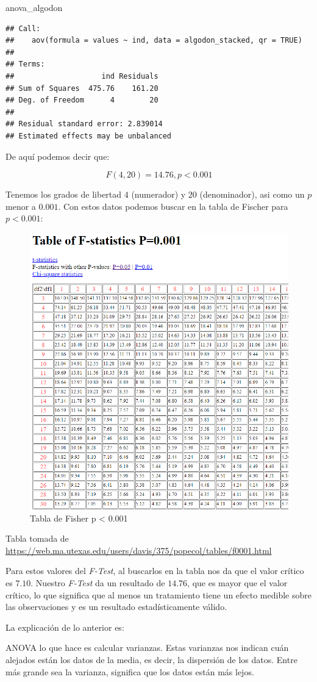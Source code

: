 \documentclass[]{article}
\newenvironment{Shaded}{\begin{snugshade}}{\end{snugshade}}
\newcommand{\NormalTok}[1]{#1}
\begin{document}
\begin{Shaded}
\begin{Highlighting}[]
\NormalTok{anova_algodon}
\end{Highlighting}
\end{Shaded}

\begin{verbatim}
## Call:
##    aov(formula = values ~ ind, data = algodon_stacked, qr = TRUE)
## 
## Terms:
##                    ind Residuals
## Sum of Squares  475.76    161.20
## Deg. of Freedom      4        20
## 
## Residual standard error: 2.839014
## Estimated effects may be unbalanced
\end{verbatim}

De aquí podemos decir que:

\[F(4,20)=14.76, p < 0.001\]

Tenemos los grados de libertad \(4\) (numerador) y \(20\) (denominador),
asi como un \(p\) menor a \(0.001\). Con estos datos podemos buscar en
la tabla de Fischer para \(p<0.001\): \renewcommand{\figurename}{Fig.}

\begin{figure}

{\centering \includegraphics[width=0.3\linewidth]{ftable001} 

}

\caption{Tabla de Fisher p < 0.001}\label{fig:unnamed-chunk-9}
\end{figure}

Tabla tomada de
\url{https://web.ma.utexas.edu/users/davis/375/popecol/tables/f0001.html}

Para estos valores del \emph{F-Test}, al buscarlos en la tabla nos da
que el valor crítico es \(7.10\). Nuestro \emph{F-Test} da un resultado
de \(14.76\), que es mayor que el valor crítico, lo que significa que al
menos un tratamiento tiene un efecto medible sobre las observaciones y
es un resultado estadísticamente válido.

La explicación de lo anterior es:

ANOVA lo que hace es calcular varianzas. Estas varianzas nos indican
cuán alejados están los datos de la media, es decir, la dispersión de
los datos. Entre más grande sea la varianza, significa que los datos
están más lejos.
\end{document}
